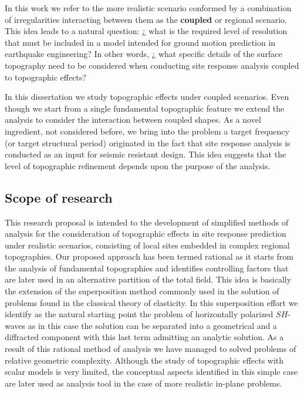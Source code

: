 \documentclass[11pt,letterpaper]{article}
\begin{document}
In this work we refer to the more realistic scenario conformed by a combination of irregularities interacting between them as the {\bf coupled} or regional scenario. This idea leads to a natural question: ¿ what is the required level of resolution that must be included in a model intended for ground  motion prediction in earthquake engineering? In other words, ¿ what specific details of the surface topography need to be considered when conducting site response analysis coupled to topographic effects?

In this dissertation we study topographic effects under coupled scenarios. Even though we start from a single fundamental topographic feature we extend the analysis to consider the interaction between coupled shapes. As a novel ingredient, not considered before, we bring into the problem a target frequency (or target structural period) originated in the fact that site response analysis is conducted as an input for seismic resistant design. This idea suggests that the level of topographic refinement depends upon the purpose of the analysis. 



\subsection*{Scope of research}
This research proposal is intended to the development of simplified methods of analysis for the consideration of topographic effects in site response prediction under realistic scenarios, consisting of local sites embedded in complex regional topographies. Our proposed approach has been termed rational as it starts from the analysis of fundamental topographies and identifies controlling factors that are later used in an alternative partition of the total field. This idea is basically the extension of the superposition method commonly used in the solution of problems found in the classical theory of elasticity. In this superposition effort we identify as the natural starting point the problem of horizontally polarized $SH$-waves as in this case the solution can be separated into a geometrical and a diffracted component with this last term admitting an analytic solution. As a result of this rational method of analysis we have managed to solved problems of relative geometric complexity. Although the study of topographic effects with scalar models is very limited, the conceptual aspects identified in this simple case are later used as analysis tool in the case of more realistic in-plane problems.
\end{document}
